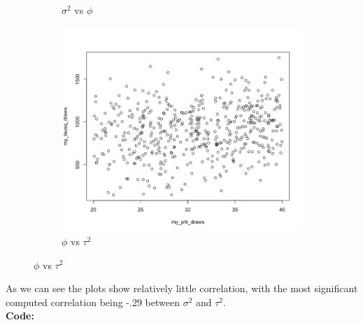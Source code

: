 \documentclass[12pt]{article}
\makeatletter
\theoremstyle{homework}
\newenvironment{exercise}[1]
{\def\@currentlabel{#1}\exercisecore}
{\endexercisecore}
\makeatother
\begin{document}
\begin{exercise}{3}
\begin{figure}[H]
\begin{subfigure}[b]{0.45\textwidth}
        \caption{$\sigma^2$ vs $\phi$}
    \end{subfigure}
    \hfill
    \begin{subfigure}[b]{0.45\textwidth}
        \centering
        \includegraphics[width=\textwidth]{Rplot19.png}
        \caption{$\phi$ vs $\tau^2$}
    \end{subfigure}
\end{figure}
  As we can see the plots show relatively little correlation, with the most significant 
  computed correlation being -.29 between $\sigma^2$ and $\tau^2$. \\
  \textbf{Code:}
  \begin{center}
  
  \end{center}
\end{exercise}
\vspace{1in}
\end{document}
